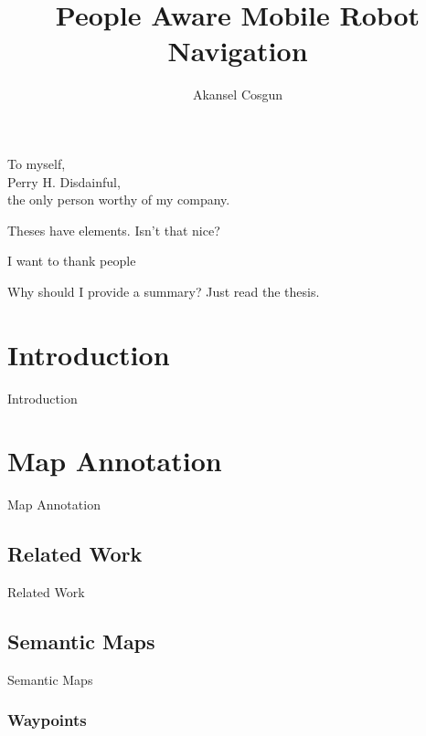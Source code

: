 \documentclass[12pt]{gatech-thesis}
\title{People Aware Mobile Robot Navigation} %
\author{Akansel Cosgun}
\begin{document}

\begin{preliminary}
\begin{dedication}
\null\vfil
{\large
\begin{center}
To myself,\\\vspace{12pt}
Perry H. Disdainful,\\\vspace{12pt}
the only person worthy of my company.
\end{center}}
\vfil\null
\end{dedication}
\begin{preface}
Theses have elements.  Isn't that nice?
\end{preface}
\begin{acknowledgements}
I want to thank people
\end{acknowledgements}
\contents
\begin{summary}
Why should I provide a summary?  Just read the thesis.
\end{summary}
\end{preliminary}
\chapter{Introduction}

Introduction

\chapter{Map Annotation}

Map Annotation
  
\section{Related Work}

Related Work

\section{Semantic Maps}

Semantic Maps

\subsection{Waypoints}
\end{document}
